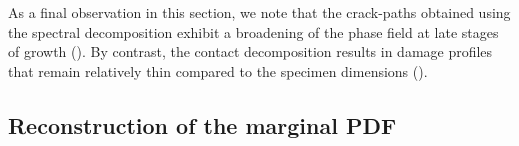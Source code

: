 As a final observation in this section, we note that the crack-paths obtained using the spectral decomposition exhibit a broadening of the phase field at late stages of growth ().  By contrast, the contact decomposition results in damage profiles that remain relatively thin compared to the specimen dimensions ().


\subsection{Reconstruction of the marginal PDF}
